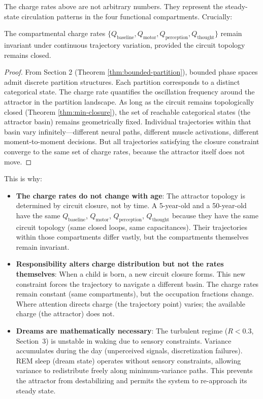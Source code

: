 The charge rates above are not arbitrary numbers. They represent the steady-state circulation patterns in the four functional compartments. Crucially:

\begin{theorem}
\label{thm:attractor-invariance}
The compartmental charge rates $\{Q_{\text{baseline}}, Q_{\text{motor}}, Q_{\text{perception}}, Q_{\text{thought}}\}$ remain invariant under continuous trajectory variation, provided the circuit topology remains closed.
\end{theorem}

\begin{proof}
From Section 2 (Theorem \ref{thm:bounded-partition}), bounded phase spaces admit discrete partition structures. Each partition corresponds to a distinct categorical state. The charge rate quantifies the oscillation frequency around the attractor in the partition landscape. As long as the circuit remains topologically closed (Theorem \ref{thm:min-closure}), the set of reachable categorical states (the attractor basin) remains geometrically fixed. Individual trajectories within that basin vary infinitely—different neural paths, different muscle activations, different moment-to-moment decisions. But all trajectories satisfying the closure constraint converge to the same set of charge rates, because the attractor itself does not move.
\end{proof}

This is why:
\begin{itemize}
    \item \textbf{The charge rates do not change with age}: The attractor topology is determined by circuit closure, not by time. A 5-year-old and a 50-year-old have the same $Q_{\text{baseline}}$, $Q_{\text{motor}}$, $Q_{\text{perception}}$, $Q_{\text{thought}}$ because they have the same circuit topology (same closed loops, same capacitances). Their trajectories within those compartments differ vastly, but the compartments themselves remain invariant.
    \item \textbf{Responsibility alters charge distribution but not the rates themselves}: When a child is born, a new circuit closure forms. This new constraint forces the trajectory to navigate a different basin. The charge rates remain constant (same compartments), but the occupation fractions change. Where attention directs charge (the trajectory point) varies; the available charge (the attractor) does not.
    \item \textbf{Dreams are mathematically necessary}: The turbulent regime ($R < 0.3$, Section~3) is unstable in waking due to sensory constraints. Variance accumulates during the day (unperceived signals, discretization failures). REM sleep (dream state) operates without sensory constraints, allowing variance to redistribute freely along minimum-variance paths. This prevents the attractor from destabilizing and permits the system to re-approach its steady state.
\end{itemize}

